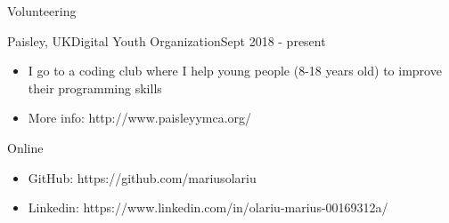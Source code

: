 \documentclass[]{mcdowellcv}
\begin{document}
	\begin{cvsection}{Volunteering}
		\begin{cvsubsection}{Paisley, UK}{Digital Youth Organization}{Sept 2018 - present}
			\begin{itemize}
				\item I go to a coding club where I help young people (8-18 years old) to improve their programming skills
				\item More info: http://www.paisleyymca.org/
			\end{itemize}
		\end{cvsubsection}
	\end{cvsection}

	\begin{cvsection}{Online}
		\begin{cvsubsection}{}{}{}
			\begin{itemize}
				\item GitHub: https://github.com/mariusolariu
				\item Linkedin: https://www.linkedin.com/in/olariu-marius-00169312a/
			\end{itemize}
		\end{cvsubsection}
	\end{cvsection}
	
\end{document}
